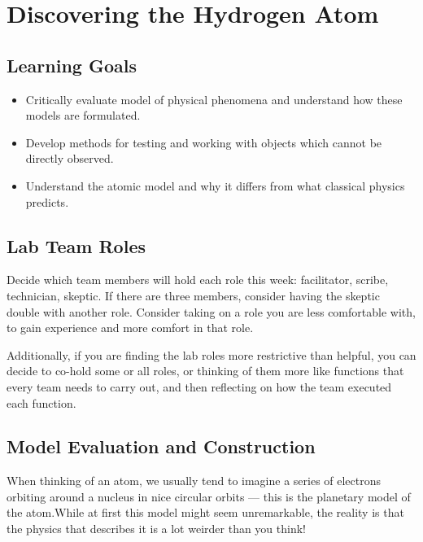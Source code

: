 \chapter{Discovering the Hydrogen Atom}

\section{Learning Goals}

\begin{itemize}
	\item Critically evaluate model of physical phenomena and understand how these models are formulated.
	
	\item Develop methods for testing and working with objects which cannot be directly observed. 
	
	\item Understand the atomic model and why it differs from what classical physics predicts.
\end{itemize}

\section{Lab Team Roles}

Decide which team members will hold each role this week: facilitator, scribe, technician, skeptic. If there are three members, consider having the skeptic double with another role. Consider taking on a role you are less comfortable with, to gain experience and more comfort in that role.

Additionally, if you are finding the lab roles more restrictive than helpful, you can decide to co-hold some or all roles, or thinking of them more like functions that every team needs to carry out, and then reflecting on how the team executed each function.

\section{Model Evaluation and Construction}
When thinking of an atom, we usually tend to imagine a series of electrons orbiting around a nucleus in nice circular orbits --- this is the planetary model of the atom.While at first this model might seem unremarkable, the reality is that the physics that describes it is a lot weirder than you think! 

